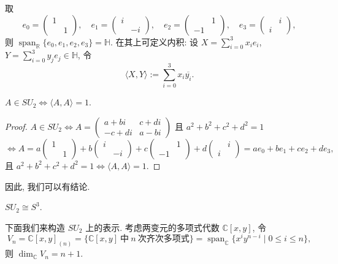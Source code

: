取
\[
  e_0=\begin{pmatrix}1&\\&1\end{pmatrix},\quad
  e_1=\begin{pmatrix}i&\\&-i\end{pmatrix},\quad
  e_2=\begin{pmatrix}&1\\-1&\end{pmatrix},\quad
  e_3=\begin{pmatrix}&i\\ i&\end{pmatrix},
\]
则 $\operatorname{span}_{\mathbb{R}}\{e_0,e_1,e_2,e_3\}=\mathbb{H}$.
在其上可定义内积: 设 $X=\sum_{i=0}^{3}x_ie_i$, $Y=\sum_{i=0}^{3}y_je_j\in\mathbb{H}$, 令
\[
  \langle X,Y\rangle:=\sum_{i=0}^{3}x_i\overline{y_i}.
\]

\begin{lemma}\label{lem:SU2-norm-one}
$A\in SU_2\iff\langle A,A\rangle=1$.
\end{lemma}

\begin{proof}
$A\in SU_2\iff A=\begin{pmatrix}a+bi&c+di\\-c+di&a-bi\end{pmatrix}$ 且
$a^2+b^2+c^2+d^2=1$
\[
  \iff A=a\begin{pmatrix}1&\\&1\end{pmatrix}+b\begin{pmatrix}i&\\&-i\end{pmatrix}
  +c\begin{pmatrix}&1\\-1&\end{pmatrix}+d\begin{pmatrix}&i\\ i&\end{pmatrix}
  =ae_0+be_1+ce_2+de_3,
\]
且 $a^2+b^2+c^2+d^2=1\iff\langle A,A\rangle=1$.
\end{proof}

因此, 我们可以有结论.

\begin{proposition}\label{prop:SU2-S3}
$SU_2\cong S^3$.
\end{proposition}

下面我们来构造 $SU_2$ 上的表示. 考虑两变元的多项式代数 $\mathbb{C}[x,y]$, 令
\[
  V_n=\mathbb{C}[x,y]_{(n)}=\{\mathbb{C}[x,y]\ \text{中}\ n\ \text{次齐次多项式}\}
  =\operatorname{span}_{\mathbb{C}}\{x^iy^{n-i}\mid 0\le i\le n\},
\]
则 $\dim_{\mathbb{C}}V_n=n+1$.

